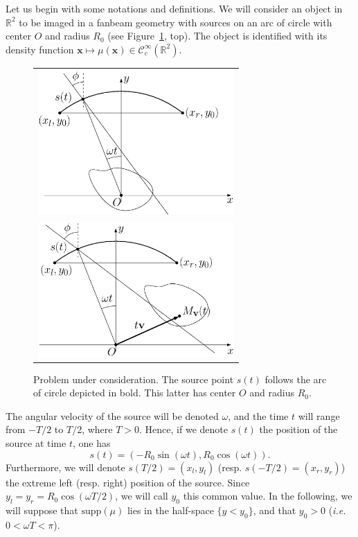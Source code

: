 \documentclass[twocolumn]{IEEEtran}
\numberwithin{equation}{section}
\newcommand{\R}{\mathbb{R}}
\newcommand{\ie}{\emph{i.e.} }
\newcommand{\Ccinf}{\mathcal{C}_c^{\infty}}
\newcommand{\supp}{\textrm{supp}}
\begin{document}
Let us begin with some notations and definitions. We will consider an object in $\R^2$ to be imaged in a fanbeam geometry with sources on an arc of circle with center $O$ and radius $R_0$ (see Figure~\ref{fig:notations}, top). The object is identified with its density function $\mathbf{x} \mapsto \mu(\mathbf{x}) \in \Ccinf(\R^2)$.
\begin{figure}[!ht]
	\centering
	\begin{tabular}{c}
	\includegraphics[width=75mm]{figs/frame_scanner_still.eps} \\
	\includegraphics[width=75mm]{figs/frame_scanner.eps}
	\end{tabular}
	\caption{Problem under consideration. The source point $s(t)$ follows the arc of circle depicted in bold. This latter has center $O$ and radius $R_0$.\label{fig:notations}}
\end{figure}
The angular velocity of the source will be denoted $\omega$, and the time $t$ will range from $-T/2$ to $T/2$, where $T>0$. Hence, if we denote $s(t)$ the position of the source at time $t$, one has
\begin{equation}
	s(t) = \left( -R_0 \sin(\omega t), R_0 \cos(\omega t) \right).
\label{eq:source_position}
\end{equation}
Furthermore, we will denote $s(T/2)=(x_l,y_l)$ (resp. $s(-T/2)=(x_r,y_r)$) the extreme left (resp. right) position of the source. Since $y_l = y_r = R_0 \cos(\omega T/2)$, we will call $y_0$ this common value. In the following, we will suppose that $\supp(\mu)$ lies in the half-space $\{ y < y_0 \}$, and that $y_0 > 0$ (\ie $0 < \omega T < \pi$).
\end{document}
